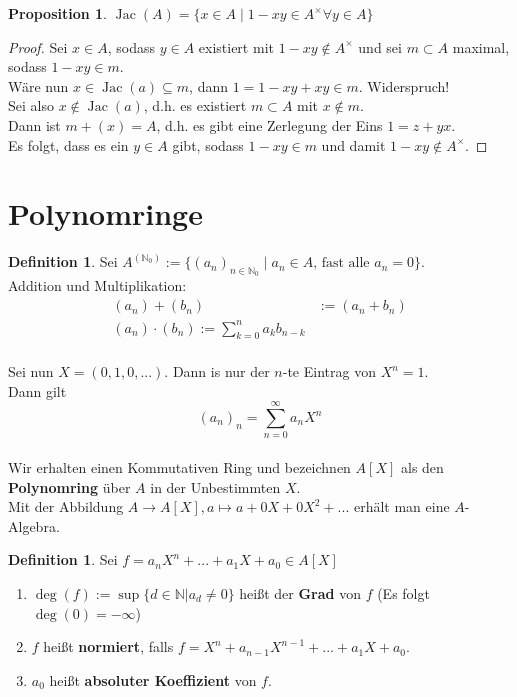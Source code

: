 \documentclass[10pt,a4paper]{article}
\newcommand{\N}{\ensuremath{\mathbb{N}}}
\newcommand{\Jac}{\ensuremath{\operatorname{Jac}}}
\newcounter{thm}[section]
\theoremstyle{definition}
\newtheorem{definition}[thm]{Definition}
\newtheorem{prop}[thm]{Proposition}
\theoremstyle{plain}
\theoremstyle{remark}
\begin{document}
\begin{prop}
	$\Jac(A)=\{x\in A\mid 1-xy\in A^\times\forall y\in A \}$
\end{prop}
\begin{proof}
	Sei $x\in A$, sodass $y\in A$ existiert mit $1-xy\notin A^\times$ und sei $m\subset A$ maximal, sodass $1-xy\in m$.\\
	Wäre nun $x\in \Jac(a)\subseteq m$, dann $1=1-xy+xy\in m$. Widerspruch!\\
	Sei also $x\notin\Jac(a)$, d.h. es existiert $m\subset A$ mit $x\notin m$.\\
	Dann ist $m+(x)=A$, d.h. es gibt eine Zerlegung der Eins $1=z+yx$.\\
	Es folgt, dass es ein $y\in A$ gibt, sodass $1-xy\in m$ und damit $1-xy\notin A^\times$.
\end{proof}





\section{Polynomringe}


\begin{definition}
	Sei $A^{(\N_0)}:=\{(a_n)_{n\in\N_0}\mid \text{$a_n\in A$, fast alle $a_n=0$}\}$.\\
	Addition und Multiplikation:
	\begin{align*}
	(a_n)+(b_n)&:=(a_n+b_n)\\
	(a_n)\cdot(b_n):=\sum_{k=0}^{n}a_kb_{n-k}
	\end{align*}\\
	Sei nun $X=(0,1,0,...)$. Dann is nur der $n$-te Eintrag von $X^n=1$.\\
	Dann gilt
	\[(a_n)_n=\sum_{n=0}^{\infty}a_nX^n\]\\
	Wir erhalten einen Kommutativen Ring und bezeichnen $A[X]$ als den \textbf{Polynomring} über $A$ in der Unbestimmten $X$.\\
	Mit der Abbildung $A\to A[X],a\mapsto a+0X+0X^2+...$ erhält man eine $A$-Algebra.
\end{definition}

\begin{definition}
	Sei $f=a_nX^n+...+a_1X+a_0\in A[X]$
	\begin{enumerate}
		\item $\deg(f):=\sup\{d\in\N|a_d\neq 0\}$ heißt der \textbf{Grad} von $f$
		(Es folgt $\deg(0)=-\infty$)
		\item $f$ heißt \textbf{normiert}, falls $f=X^n+a_{n-1}X^{n-1}+...+a_1X+a_0$.
		\item $a_0$ heißt \textbf{absoluter Koeffizient} von $f$.
	\end{enumerate}
\end{definition}
\end{document}
